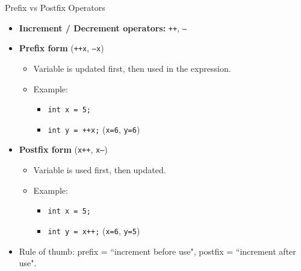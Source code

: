 \documentclass[12pt, aspectratio=169]{beamer}
\begin{document}
    \begin{frame}{Prefix vs Postfix Operators}
        \begin{itemize}
            \item \textbf{Increment / Decrement operators:} \texttt{++}, \texttt{--}
            \item \textbf{Prefix form} (\texttt{++x}, \texttt{--x})
                \begin{itemize}
                    \item Variable is updated first, then used in the expression.
                    \item Example: 
                        \begin{itemize}
                            \item \texttt{int x = 5;}
                            \item \texttt{int y = ++x;} \hfill (\texttt{x=6}, \texttt{y=6})
                        \end{itemize}
                \end{itemize}
            \item \textbf{Postfix form} (\texttt{x++}, \texttt{x--})
                \begin{itemize}
                    \item Variable is used first, then updated.
                    \item Example: 
                        \begin{itemize}
                            \item \texttt{int x = 5;}
                            \item \texttt{int y = x++;} \hfill (\texttt{x=6}, \texttt{y=5})
                        \end{itemize}
                \end{itemize}
            \item Rule of thumb: prefix = ``increment before use", postfix = ``increment after use".
        \end{itemize}
    \end{frame}
\end{document}
